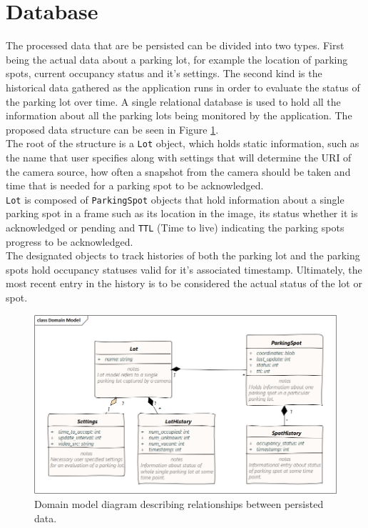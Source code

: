 \documentclass[thesis=M,english]{FITthesis}[2019/03/06]
\begin{document}
\section{Database}
The processed data that are be persisted can be divided into two types. First being the actual data about a parking lot, for example the location of parking spots, current occupancy status and it's settings. The second kind is the historical data gathered as the application runs in order to evaluate the status of the parking lot over time. A single relational database is used to hold all the information about all the parking lots being monitored by the application. The proposed data structure can be seen in Figure \ref{label:domain_model}.\\


The root of the structure is a \texttt{Lot} object, which holds static information, such as the name that user specifies along with settings that will determine the URI of the camera source, how often a snapshot from the camera should be taken and time that is needed for a parking spot to be acknowledged.\\

\texttt{Lot} is composed of \texttt{ParkingSpot} objects that hold information about a single parking spot in a frame such as its location in the image, its status whether it is acknowledged or pending and \texttt{TTL} (Time to live) indicating the parking spots progress to be acknowledged.\\

The designated objects to track histories of both the parking lot and the parking spots hold occupancy statuses valid for it's associated timestamp. Ultimately, the most recent entry in the history is to be considered the actual status of the lot or spot.






\begin{figure}[ht!]
	\centering
	\includegraphics[width=\textwidth]{imgs/domainmodel.png}
	\caption{Domain model diagram describing relationships between persisted data.}
	\label{label:domain_model}
\end{figure}
\end{document}
